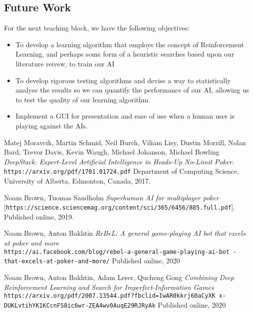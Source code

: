 \documentclass{article}
\begin{document}
\begin{multicols*}{2}
\section{Future Work}
For the next teaching block, we have the following objectives:
\begin{itemize}
    \item To develop a learning algorithm that employs the concept of Reinforcement Learning, and perhaps some form of a heuristic searches based upon our literature reivew, to train our AI
    \item To develop rigorous testing algorithms and devise a way to statistically analyse the results so we can quantify the performance of our AI, allowing us to test the quality of our learning algorithm.
    \item Implement a GUI for presentation and ease of use when a human user is playing against the AIs.
\end{itemize}





\end{multicols*}









\begin{thebibliography}{9}
Matej Moravcik, Martin Schmid, Neil Burch, Viliam Lisy, Dustin Morrill, Nolan Bard, Trevor Davis, Kevin Waugh, Michael Johanson, Michael Bowling
\textit{DeepStack: Expert-Level Artificial Intelligence in
Heads-Up No-Limit Poker}.
\texttt{https://arxiv.org/pdf/1701.01724.pdf}
Department of Computing Science, University of Alberta, Edmonton, Canada, 2017.

Noam Brown, Tuomas Sandholm
\textit{Superhuman AI for multiplayer poker}
[\texttt{https://science.sciencemag.org/content/sci/365/6456/885.full.pdf}].
Published online, 2019.

Noam Brown, Anton Bakhtin
\textit{ReBeL: A general game-playing AI bot that excels at poker and more}
\\\texttt{https://ai.facebook.com/blog/rebel-a-general-game-playing-ai-bot
-that-excels-at-poker-and-more/}
Published online, 2020

Noam Brown, Anton Bakhtin, Adam Lerer, Qucheng Gong
\textit{Combining Deep Reinforcement Learning and Search
for Imperfect-Information Games}
\\\texttt{https://arxiv.org/pdf/2007.13544.pdf?fbclid=IwAR0kkrj60aCyXK
x-DUKLvtihYK1KCcnFS8ic6wr-ZEA4wv0AuqE29RJRyAk}
Published online, 2020





\end{thebibliography}
\end{document}
